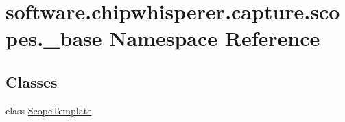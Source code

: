 \hypertarget{namespacesoftware_1_1chipwhisperer_1_1capture_1_1scopes_1_1__base}{}\section{software.\+chipwhisperer.\+capture.\+scopes.\+\_\+base Namespace Reference}
\label{namespacesoftware_1_1chipwhisperer_1_1capture_1_1scopes_1_1__base}
\subsection*{Classes}
\begin{DoxyCompactItemize}
\item 
class \hyperlink{classsoftware_1_1chipwhisperer_1_1capture_1_1scopes_1_1__base_1_1ScopeTemplate}{Scope\+Template}
\end{DoxyCompactItemize}
